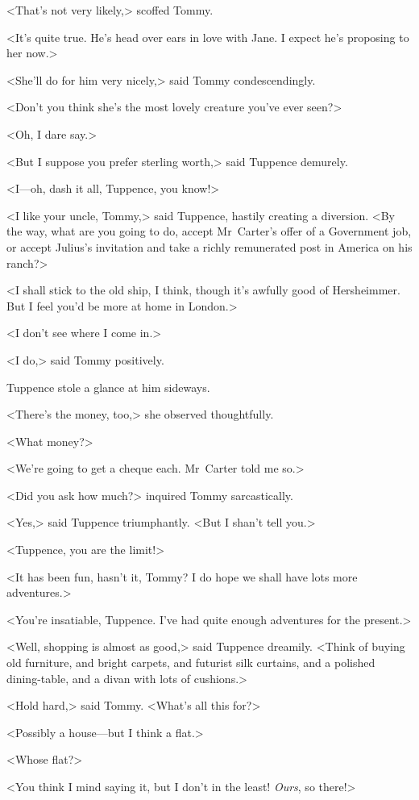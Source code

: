 <That's not very likely,> scoffed Tommy.

<It's quite true. He's head over ears in love with Jane. I expect he's proposing to her now.>

<She'll do for him very nicely,> said Tommy condescendingly.

<Don't you think she's the most lovely creature you've ever seen?>

<Oh, I dare say.>

<But I suppose you prefer sterling worth,> said Tuppence demurely.

<I—oh, dash it all, Tuppence, you know!>

<I like your uncle, Tommy,> said Tuppence, hastily creating a diversion. <By the way, what are you going to do, accept Mr~Carter's offer of a Government job, or accept Julius's invitation and take a richly remunerated post in America on his ranch?>

<I shall stick to the old ship, I think, though it's awfully good of Hersheimmer. But I feel you'd be more at home in London.>

<I don't see where I come in.>

<I do,> said Tommy positively.

Tuppence stole a glance at him sideways.

<There's the money, too,> she observed thoughtfully.

<What money?>

<We're going to get a cheque each. Mr~Carter told me so.>

<Did you ask how much?> inquired Tommy sarcastically.

<Yes,> said Tuppence triumphantly. <But I shan't tell you.>

<Tuppence, you are the limit!>

<It has been fun, hasn't it, Tommy? I do hope we shall have lots more adventures.>

<You're insatiable, Tuppence. I've had quite enough adventures for the present.>

<Well, shopping is almost as good,> said Tuppence dreamily. <Think of buying old furniture, and bright carpets, and futurist silk curtains, and a polished dining-table, and a divan with lots of cushions.>

<Hold hard,> said Tommy. <What's all this for?>

<Possibly a house—but I think a flat.>

<Whose flat?>

<You think I mind saying it, but I don't in the least! \emph{Ours}, so there!>

